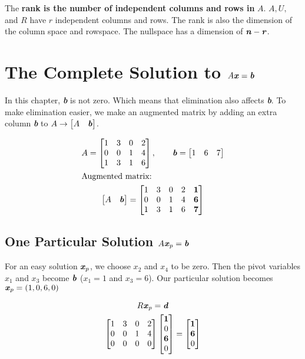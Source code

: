 \documentclass[12pt, letterpaper]{article}
\newcommand{\V}[1]{\textbf{\textit{#1}}}
\theoremstyle{definition}
\begin{document}
	The \textbf{rank is the number of independent columns and rows in} $A$. $A, U,$ and $R$ have $r$ independent columns and rows. The rank is also the dimension of the column space and rowspace. The nullspace has a dimension of $\V{n} - \V{r}$.
	
	
\section{The Complete Solution to $A\V{x} = \V{b}$}
	In this chapter, \V{b} is not zero. Which means that elimination also affects \V{b}. To make elimination easier, we make an augmented matrix by adding an extra column \V{b} to $A \rightarrow \begin{bmatrix} A & \V{b}\end{bmatrix}$.
	
		\begin{gather*}
			A = \begin{bmatrix}
			1&3&0&2\\
			0&0&1&4\\
			1&3&1&6
			\end{bmatrix}, \qquad \V{b} = \begin{bmatrix} 1 & 6 & 7 \end{bmatrix} \\
		\intertext{Augmented matrix:}
			\begin{bmatrix} A & \V{b}\end{bmatrix} = \begin{bmatrix}
														1&3&0&2 & \textbf{1}\\
														0&0&1&4 & \textbf{6}\\
														1&3&1&6 & \textbf{7}
													\end{bmatrix}
		\end{gather*}
	
	
\subsection{One Particular Solution $A\V{x}_p = \V{b}$}
	For an easy solution $\V{x}_p$, we choose $x_2$ and $x_4$ to be zero. Then the pivot variables $x_1$ and $x_3$ become $\V{b}$ ($x_1=1$ and $x_3=6$). Our particular solution becomes $\V{x}_p = (1,0,6,0)$
	
		\begin{gather*}
			R\V{x}_p = \V{d} \\
			\begin{bmatrix}
					1&3&0&2\\
					0&0&1&4\\
					0&0&0&0
				\end{bmatrix} \begin{bmatrix}\textbf{1} \\
											  0 \\
											  \textbf{6} \\
											  0 \end{bmatrix} = \begin{bmatrix}
											  						\textbf{1} \\ \textbf{6} \\ 0
											  					\end{bmatrix}
		\end{gather*} 
	
\end{document}
